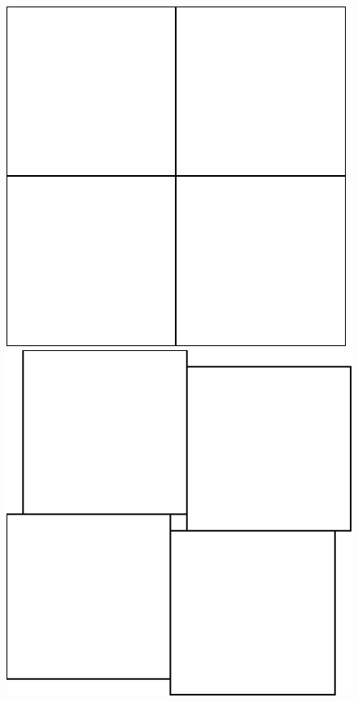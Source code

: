 \begin{figure}[!htbp]
\begin{minipage}[c]{.4\linewidth}
\centerline{\includegraphics[width=\linewidth]{comp4Squares}}
\end{minipage}
\hfill
\begin{minipage}[c]{.4\linewidth}
\centerline{\includegraphics[width=\linewidth]{comp4SquaresTwo}}
\end{minipage}
\label{c7groscarre}
\end{figure}
 

